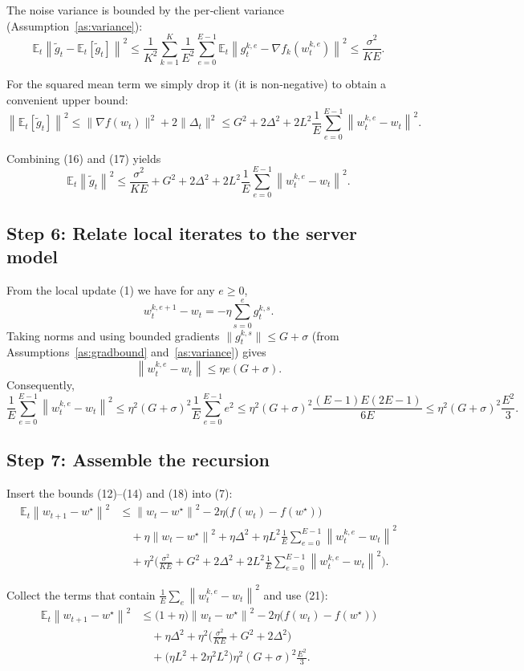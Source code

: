 \documentclass{article}
\newcommand{\E}{\mathbb{E}}
\newcommand{\norm}[1]{\left\|#1\right\|}
\begin{document}
The noise variance is bounded by the per‑client variance (Assumption~\ref{as:variance}):
\[
\E_t\norm{\widetilde g_t-\E_t[\widetilde g_t]}^2
\le \frac1{K^2}\sum_{k=1}^K\frac1{E^2}\sum_{e=0}^{E-1}\E_t\norm{g_{t}^{k,e}-\nabla f_k(w_{t}^{k,e})}^2
\le \frac{\sigma^2}{K E}.
\tag{16}
\]

For the squared mean term we simply drop it (it is non‑negative) to obtain a convenient upper bound:
\[
\norm{\E_t[\widetilde g_t]}^2\le \Big\|\nabla f(w_t)\Big\|^2 + 2\big\|\Delta_t\big\|^2
\le G^2 + 2\Delta^2 + 2L^2\frac1{E}\sum_{e=0}^{E-1}\norm{w_{t}^{k,e}-w_t}^2 .
\tag{17}
\]

Combining (16) and (17) yields
\[
\E_t\norm{\widetilde g_t}^2
\le \frac{\sigma^2}{K E}+ G^2 + 2\Delta^2 + 2L^2\frac1{E}\sum_{e=0}^{E-1}\norm{w_{t}^{k,e}-w_t}^2 .
\tag{18}
\]

\subsection*{Step 6: Relate local iterates to the server model}
From the local update (1) we have for any $e\ge0$,
\[
w_{t}^{k,e+1}-w_t = -\eta\sum_{s=0}^{e} g_{t}^{k,s}.
\tag{19}
\]
Taking norms and using bounded gradients $\|g_{t}^{k,s}\|\le G+\sigma$ (from Assumptions~\ref{as:gradbound} and~\ref{as:variance}) gives
\[
\norm{w_{t}^{k,e}-w_t}\le \eta e (G+\sigma).
\tag{20}
\]
Consequently,
\[
\frac1{E}\sum_{e=0}^{E-1}\norm{w_{t}^{k,e}-w_t}^2
\le \eta^2 (G+\sigma)^2 \frac1{E}\sum_{e=0}^{E-1} e^2
\le \eta^2 (G+\sigma)^2 \frac{(E-1)E(2E-1)}{6E}
\le \eta^2 (G+\sigma)^2 \frac{E^2}{3}.
\tag{21}
\]

\subsection*{Step 7: Assemble the recursion}
Insert the bounds (12)–(14) and (18) into (7):
\[
\begin{aligned}
\E_t\norm{w_{t+1}-w^\star}^2
&\le \norm{w_t-w^\star}^2
-2\eta\big(f(w_t)-f(w^\star)\big) \\
&\quad + \eta\norm{w_t-w^\star}^2
+ \eta\Delta^2
+ \eta L^2 \frac1{E}\sum_{e=0}^{E-1}\norm{w_{t}^{k,e}-w_t}^2 \\
&\quad + \eta^2\Big(\frac{\sigma^2}{K E}+ G^2 + 2\Delta^2 + 2L^2 \frac1{E}\sum_{e=0}^{E-1}\norm{w_{t}^{k,e}-w_t}^2\Big).
\end{aligned}
\tag{22}
\]

Collect the terms that contain $\frac1{E}\sum_{e}\norm{w_{t}^{k,e}-w_t}^2$ and use (21):
\[
\begin{aligned}
\E_t\norm{w_{t+1}-w^\star}^2
&\le \big(1+\eta\big)\norm{w_t-w^\star}^2
-2\eta\big(f(w_t)-f(w^\star)\big) \\
&\quad + \eta\Delta^2
+ \eta^2\Big(\frac{\sigma^2}{K E}+ G^2 + 2\Delta^2\Big) \\
&\quad + \Big(\eta L^2 +2\eta^2 L^2\Big)\eta^2 (G+\sigma)^2 \frac{E^2}{3}.
\end{aligned}
\tag{23}
\]
\end{document}
